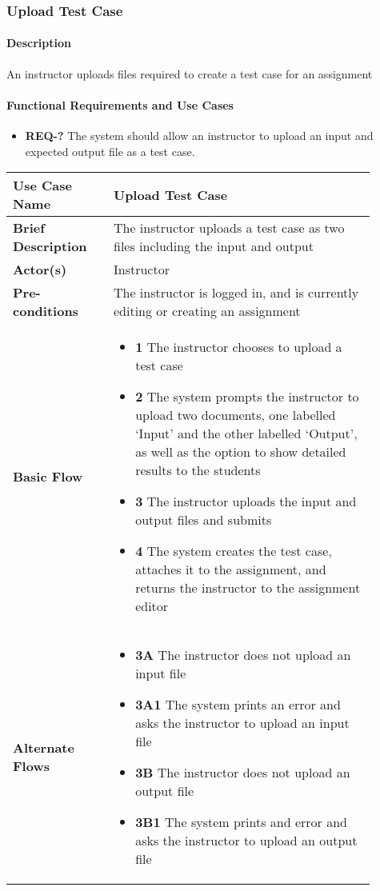 \documentclass{article}
\begin{document}
\subsubsection{Upload Test Case}

\paragraph{Description} An instructor uploads files required to create a test case for an assignment

\paragraph{Functional Requirements and Use Cases}

\begin{itemize}
  \item \textbf{REQ-?} The system should allow an instructor to upload an input and expected output file as a test case.
\end{itemize}

\vspace{0.2in}
\begin{tabular}{| p{0.25\linewidth} | p{0.65\linewidth} |}
  \hline
  \textbf{Use Case Name} & Upload Test Case \\
  \hline
  \textbf{Brief Description} & The instructor uploads a test case as two files including the input and output \\
  \hline
  \textbf{Actor(s)} & Instructor \\
  \hline
  \textbf{Pre-conditions} & The instructor is logged in, and is currently editing or creating an assignment\\
  \hline
  \textbf{Basic Flow} & \begin{itemize}
    \item[] \textbf{1} The instructor chooses to upload a test case
    \item[] \textbf{2} The system prompts the instructor to upload two documents, one labelled `Input' and the other labelled `Output', as well as the option to show detailed results to the students
    \item[] \textbf{3} The instructor uploads the input and output files and submits
    \item[] \textbf{4} The system creates the test case, attaches it to the assignment, and returns the instructor to the assignment editor
  \end{itemize}\\
  \hline
  \textbf{Alternate Flows} & \begin{itemize}
    \item[] \textbf{3A} The instructor does not upload an input file
    \item[] \textbf{3A1} The system prints an error and asks the instructor to upload an input file
    \item[] \textbf{3B} The instructor does not upload an output file
    \item[] \textbf{3B1} The system prints and error and asks the instructor to upload an output file
  \end{itemize} \\
  \hline
\end{tabular}
\end{document}
